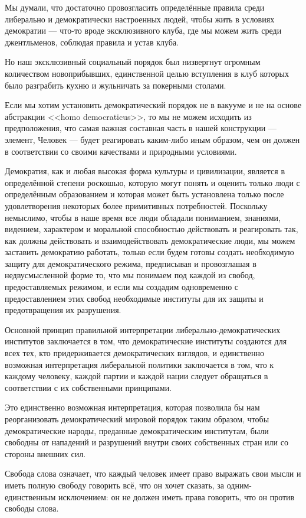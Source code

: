 Мы думали, что достаточно провозгласить определённые правила среди либерально и демократически настроенных людей, чтобы жить в условиях демократии — что-то вроде эксклюзивного клуба, где мы можем жить среди джентльменов, соблюдая правила и устав клуба.

Но наш эксклюзивный социальный порядок был низвергнут огромным количеством новоприбывших, единственной целью вступления в клуб которых было разграбить кухню и жульничать за покерными столами.

Если мы хотим установить демократический порядок не в вакууме и не на основе абстракции <<homo democraticus>>, то мы не можем исходить из предположения, что самая важная составная часть в нашей конструкции — элемент, Человек — будет реагировать каким-либо иным образом, чем он должен в соответствии со своими качествами и природными условиями.

Демократия, как и любая высокая форма культуры и цивилизации, является в определённой степени роскошью, которую могут понять и оценить только люди с определённым образованием и которая может быть установлена только после удовлетворения некоторых более примитивных потребностей. Поскольку немыслимо, чтобы в наше время все люди обладали пониманием, знаниями, видением, характером и моральной способностью действовать и реагировать так, как должны действовать и взаимодействовать демократические люди, мы можем заставить демократию работать, только если будем готовы создать необходимую защиту для демократического режима, предписывая и провозглашая в недвусмысленной форме то, что мы понимаем под каждой из свобод, предоставляемых режимом, и если мы создадим одновременно с предоставлением этих свобод необходимые институты для их защиты и предотвращения их разрушения.

Основной принцип правильной интерпретации либерально-демократических институтов заключается в том, что демократические институты создаются для всех тех, кто придерживается демократических взглядов, и единственно возможная интерпретация либеральной политики заключается в том, что к каждому человеку, каждой партии и каждой нации следует обращаться в соответствии с их собственными принципами.

Это единственно возможная интерпретация, которая позволила бы нам реорганизовать демократический мировой порядок таким образом, чтобы демократические народы, преданные демократическим институтам, были свободны от нападений и разрушений внутри своих собственных стран или со стороны внешних сил.

Свобода слова означает, что каждый человек имеет право выражать свои мысли и иметь полную свободу говорить всё, что он хочет сказать, за одним-единственным исключением: он не должен иметь права говорить, что он против свободы слова.

